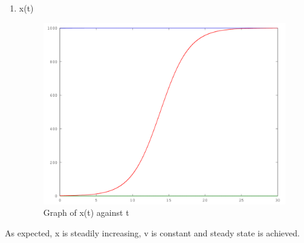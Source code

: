 \documentclass{article}
\begin{document}
\begin{enumerate}
\begin{enumerate}[label*=\arabic*.]
\begin{enumerate}[label=(\alph*)]
\begin{enumerate}[label=(\roman*)]
		\item x(t) \begin{figure}[H]
			\caption{Graph of x(t) against t}
			\includegraphics[width=\textwidth]{b_x}
		\end{figure}
	\end{enumerate}
	As expected, x is steadily increasing, v is constant and steady state is achieved.
	

\end{enumerate}
\end{enumerate}
\end{enumerate}
\end{document}
